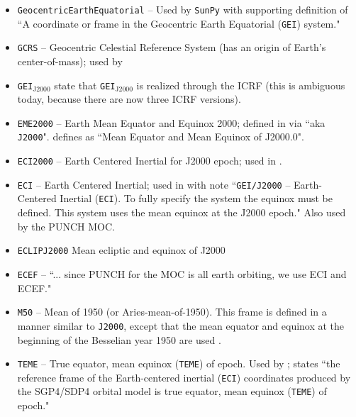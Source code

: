 \documentclass[draft]{agujournal2019}
\begin{document}
\begin{itemize}
    \item \texttt{GeocentricEarthEquatorial} -- Used by \texttt{SunPy} with supporting definition of ``A coordinate or frame in the Geocentric Earth Equatorial (\texttt{GEI}) system."
    
    \item \texttt{GCRS} -- Geocentric Celestial Reference System (has an origin of Earth's center-of-mass); used by 

    \item \texttt{GEI}$_\mathrm{J2000}$  state that \texttt{GEI}$_\mathrm{J2000}$ is realized through the ICRF (this is ambiguous today, because there are now three ICRF versions).

    \item \texttt{EME2000} -- Earth Mean Equator and Equinox 2000; defined in  via ``aka \texttt{J2000}".  defines as ``Mean Equator and Mean Equinox of J2000.0".

    \item \texttt{ECI2000} -- Earth Centered Inertial for J2000 epoch; used in \cite{Niehof2022}.

    \item \texttt{ECI} -- Earth Centered Inertial; used in  with note ``\texttt{GEI/J2000} – Earth-Centered Inertial (\texttt{ECI}). To fully specify the system the equinox must be defined. This system uses the mean equinox at the J2000 epoch." Also used by the PUNCH MOC.

    \item \texttt{ECLIPJ2000} Mean ecliptic and equinox of J2000 \cite{NAIFFrames2025}

    \item \texttt{ECEF} -- ``... since PUNCH for the MOC is all earth orbiting, we use ECI and ECEF."

    \item \texttt{M50} -- Mean of 1950 (or Aries-mean-of-1950). This frame is defined in a manner similar to \texttt{J2000}, except that the mean equator and equinox at the beginning of the Besselian year 1950 are used \cite{NASA1965}.
     
    \item \texttt{TEME} -- True equator, mean equinox (\texttt{TEME}) of epoch. Used by ;  states ``the reference frame of the Earth-centered inertial (\texttt{ECI}) coordinates produced by the SGP4/SDP4 orbital model is true equator, mean equinox (\texttt{TEME}) of epoch."


\end{itemize}
\end{document}
